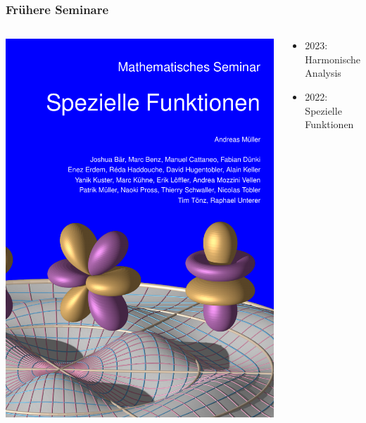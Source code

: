 %
%
%
\bgroup
\begin{frame}[t]
\setlength{\abovedisplayskip}{5pt}
\setlength{\belowdisplayskip}{5pt}
\frametitle{Frühere Seminare}
\vspace{-15pt}
\begin{columns}[t,onlytextwidth]
\begin{column}{0.44\textwidth}
\begin{center}
\includegraphics[width=\textwidth]{../slides/0/front.pdf}
\end{center}
\end{column}
\begin{column}{0.52\textwidth}
\begin{itemize}
\item {\color{gray}2023: Harmonische Analysis}
\item 2022: Spezielle Funktionen

\end{itemize}
\end{column}
\end{columns}
\end{frame}
